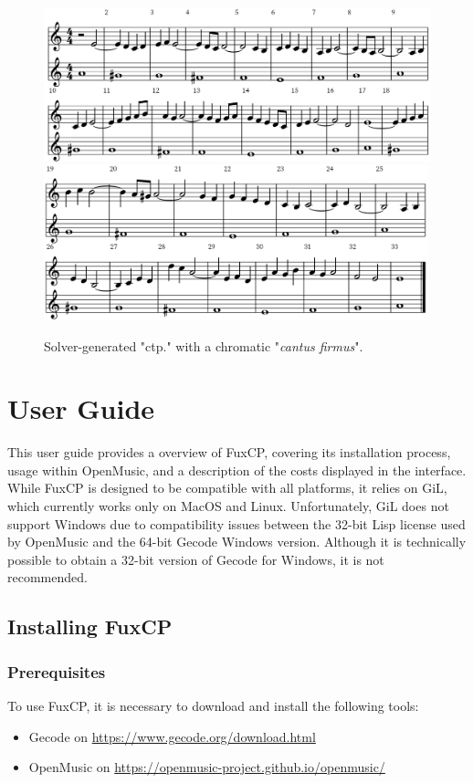 \begin{figure}[h]
    \centering
    \includegraphics[width=\textwidth]{Images/exp1.png}
    \includegraphics[width=0.99\textwidth]{Images/exp2.png}
    \caption{Solver-generated  "ctp." with a chromatic "\textit{cantus firmus}".}
    \label{fig:exp_scores}
\end{figure}

\chapter{User Guide}
This user guide provides a overview of FuxCP, covering its installation process, usage within OpenMusic, and a description of the costs displayed in the interface. While FuxCP is designed to be compatible with all platforms, it relies on GiL, which currently works only on MacOS and Linux. Unfortunately, GiL does not support Windows due to compatibility issues between the 32-bit Lisp license used by OpenMusic and the 64-bit Gecode Windows version. Although it is technically possible to obtain a 32-bit version of Gecode for Windows, it is not recommended. 

\section{Installing FuxCP}
\subsection{Prerequisites}
To use FuxCP, it is necessary to download and install the following tools:
\begin{itemize}
    \item Gecode on \url{https://www.gecode.org/download.html}
    \item OpenMusic on \url{https://openmusic-project.github.io/openmusic/}
\end{itemize}

